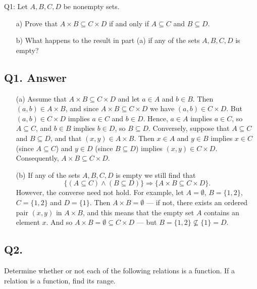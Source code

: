 \documentclass{article}
\begin{document}
Q1: Let \( A, B, C, D \) be nonempty sets.

\begin{enumerate}
    \item[a)] Prove that \( A \times B \subseteq C \times D \) if and only if \( A \subseteq C \) and \( B \subseteq D \).
    \item[b)] What happens to the result in part (a) if any of the sets \( A, B, C, D \) is empty?
\end{enumerate}

\newpage

\subsection*{ Q1. Answer}
\begin{enumerate}
    \item[(a)] Assume that \( A \times B \subseteq C \times D \) and let \( a \in A \) and \( b \in B \). Then \( (a, b) \in A \times B \), and since \( A \times B \subseteq C \times D \) we have \( (a, b) \in C \times D \). But \( (a, b) \in C \times D \) implies \( a \in C \) and \( b \in D \). Hence, \( a \in A \) implies \( a \in C \), so \( A \subseteq C \), and \( b \in B \) implies \( b \in D \), so \( B \subseteq D \).
    Conversely, suppose that \( A \subseteq C \) and \( B \subseteq D \), and that \( (x, y) \in A \times B \). Then \( x \in A \) and \( y \in B \) implies \( x \in C \) (since \( A \subseteq C \)) and \( y \in D \) (since \( B \subseteq D \)) implies \( (x, y) \in C \times D \). Consequently, \( A \times B \subseteq C \times D \).

    \item[(b)] If any of the sets \( A, B, C, D \) is empty we still find that
    \[
    \{ (A \subseteq C) \land (B \subseteq D) \} \Rightarrow \{ A \times B \subseteq C \times D \}.
    \]
    However, the converse need not hold. For example, let \( A = \emptyset \), \( B = \{1, 2\} \), \( C = \{1, 2\} \) and \( D = \{1\} \). Then \( A \times B = \emptyset \) --- if not, there exists an ordered pair \( (x, y) \) in \( A \times B \), and this means that the empty set \( A \) contains an element \( x \). And so \( A \times B = \emptyset \subseteq C \times D \) --- but \( B = \{1, 2\} \not\subseteq \{1\} = D \).
\end{enumerate}
\newpage
\subsection*{Q2.}
 Determine whether or not each of the following relations is a function. If a relation is a function, find its range.
\end{document}
